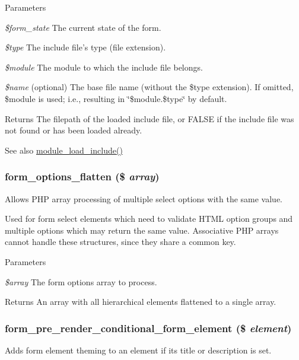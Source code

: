 \begin{DoxyParams}{Parameters}
\item[{\em \$form\_\-state}]The current state of the form. \item[{\em \$type}]The include file's type (file extension). \item[{\em \$module}]The module to which the include file belongs. \item[{\em \$name}](optional) The base file name (without the \$type extension). If omitted, \$module is used; i.e., resulting in \char`\"{}\$module.\$type\char`\"{} by default.\end{DoxyParams}
\begin{DoxyReturn}{Returns}
The filepath of the loaded include file, or FALSE if the include file was not found or has been loaded already.
\end{DoxyReturn}
\begin{DoxySeeAlso}{See also}
\hyperlink{module_8inc_a49098ed4d33650ee5ab52aab40982423}{module\_\-load\_\-include()} 
\end{DoxySeeAlso}
\hypertarget{group__form__api_ga683d5114e3e455ffee9bbfbb8b947bb7}{
\subsubsection[{form\_\-options\_\-flatten}]{\setlength{\rightskip}{0pt plus 5cm}form\_\-options\_\-flatten (\$ {\em array})}}
\label{group__form__api_ga683d5114e3e455ffee9bbfbb8b947bb7}
Allows PHP array processing of multiple select options with the same value.

Used for form select elements which need to validate HTML option groups and multiple options which may return the same value. Associative PHP arrays cannot handle these structures, since they share a common key.


\begin{DoxyParams}{Parameters}
\item[{\em \$array}]The form options array to process.\end{DoxyParams}
\begin{DoxyReturn}{Returns}
An array with all hierarchical elements flattened to a single array. 
\end{DoxyReturn}
\hypertarget{group__form__api_gac0bc3f3520adb84698903c4d0078fe2c}{
\subsubsection[{form\_\-pre\_\-render\_\-conditional\_\-form\_\-element}]{\setlength{\rightskip}{0pt plus 5cm}form\_\-pre\_\-render\_\-conditional\_\-form\_\-element (\$ {\em element})}}
\label{group__form__api_gac0bc3f3520adb84698903c4d0078fe2c}
Adds form element theming to an element if its title or description is set.

